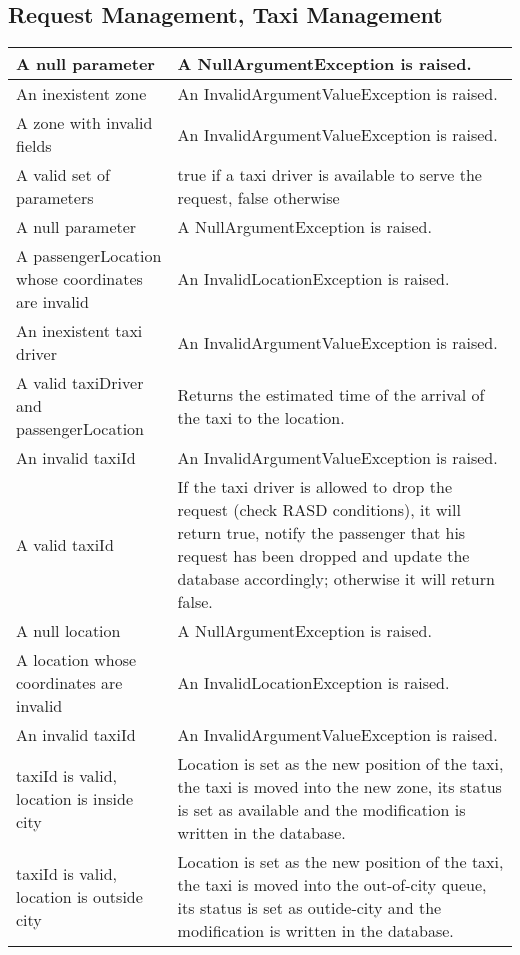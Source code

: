\subsection{Request Management, Taxi Management}
\begin{tabular}{p{5cm}|p{6cm}}
\hline
	\method{existsAvailableTaxiDriver(request, zone)}
	A null parameter &
	A NullArgumentException is raised. \\\hline
	An inexistent zone &
	An InvalidArgumentValueException is raised. \\\hline
	A zone with invalid fields &
	An InvalidArgumentValueException  is raised. \\\hline
	A valid set of parameters &
	true if a taxi driver is available to serve the request, false otherwise \\\hline\hline
	
	\method{getETA(taxiDriver, passengerLocation)}
	A null parameter &
	A NullArgumentException is raised. \\\hline
	A passengerLocation whose coordinates are invalid &
	An InvalidLocationException is raised. \\\hline
	An inexistent taxi driver &
	An InvalidArgumentValueException is raised. \\\hline
	A valid taxiDriver and passengerLocation &
	Returns the estimated time of the arrival of the taxi to the location. \\\hline

	\method{taxiDriverDroppedRequest(taxiId)}
	An invalid taxiId &
	An InvalidArgumentValueException is raised. \\\hline
	A valid taxiId &
	If the taxi driver is allowed to drop the request (check RASD conditions), it will return true, notify the passenger that his request has been dropped and update the database accordingly; otherwise it will return false.  \\\hline	
	\method{sendCurrentLocation(taxiId, location)}
	A null location &
	A NullArgumentException is raised. \\\hline
	A location whose coordinates are invalid &
	An InvalidLocationException is raised. \\\hline
	An invalid taxiId &
	An InvalidArgumentValueException is raised. \\\hline
	taxiId is valid, location is inside city&
	Location is set as the new position of the taxi, the taxi is moved into the new zone, its status is set as available and the modification is written in the database.\\\hline
	taxiId is valid, location is outside city&
	Location is set as the new position of the taxi, the taxi is moved into the out-of-city queue, its status is set as outide-city and the modification is written in the database. \\\hline\hline
\end{tabular}



